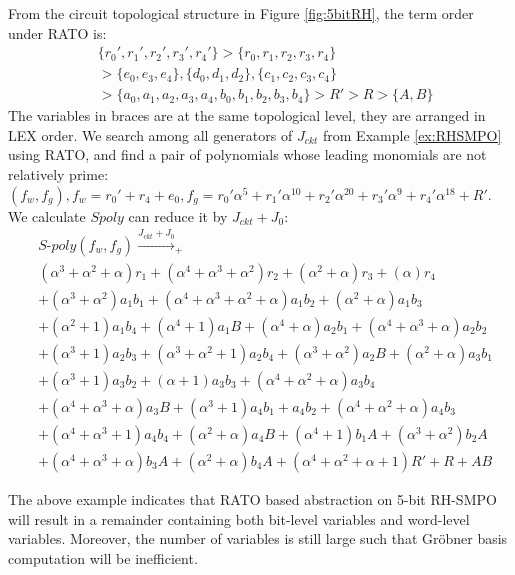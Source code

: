 \begin{Example}
\label{ex:newRATO}
From the circuit topological structure in Figure \ref{fig:5bitRH}, the term order under RATO is:
\begin{align}
&\{r_0',r_1',r_2',r_3',r_4'\}>\{r_0,r_1,r_2,r_3,r_4\}\nonumber\\
&>\{e_0,e_3,e_4\},\{d_0,d_1,d_2\},\{c_1,c_2,c_3,c_4\}\nonumber\\
&>\{a_0,a_1,a_2,a_3,a_4,b_0,b_1,b_2,b_3,b_4\}>R'>R>\{A,B\}\nonumber
\end{align}
The variables in braces are at the same topological level, they are arranged in LEX order. 
We search among all generators of $J_{ckt}$ from Example \ref{ex:RHSMPO} using RATO, 
and find a pair of polynomials whose leading 
monomials are not relatively prime:
$(f_w,f_g), f_w = r_0'+r_4+e_0, f_g =r_0'\alpha^5+r_1'\alpha^{10}+r_2'\alpha^{20}+r_3'\alpha^9+r_4'\alpha^{18} + R'$.
We calculate $Spoly$ can reduce it by $J_{ckt}+J_0$:
\begin{align}
&S\text{-}poly(f_w,f_g) \xrightarrow{J_{ckt}+J_0}_{+}\nonumber\\
&(\alpha^3+\alpha^2+\alpha) r_1+(\alpha^4+\alpha^3+\alpha^2) r_2+(\alpha^2+\alpha) r_3+(\alpha) r_4\nonumber\\
&+(\alpha^3+\alpha^2) a_1 b_1+(\alpha^4+\alpha^3+\alpha^2+\alpha) a_1 b_2+(\alpha^2+\alpha) a_1 b_3\nonumber\\
&+(\alpha^2+1) a_1 b_4+(\alpha^4+1) a_1 B+(\alpha^4+\alpha) a_2 b_1+(\alpha^4+\alpha^3+\alpha) a_2 b_2\nonumber\\
&+(\alpha^3+1) a_2 b_3+(\alpha^3+\alpha^2+1) a_2 b_4+(\alpha^3+\alpha^2) a_2 B+(\alpha^2+\alpha) a_3 b_1\nonumber\\
&+(\alpha^3+1) a_3 b_2+(\alpha+1) a_3 b_3+(\alpha^4+\alpha^2+\alpha) a_3 b_4\nonumber\\
&+(\alpha^4+\alpha^3+\alpha) a_3 B+(\alpha^3+1) a_4 b_1+a_4 b_2+(\alpha^4+\alpha^2+\alpha) a_4 b_3\nonumber\\
&+(\alpha^4+\alpha^3+1) a_4 b_4+(\alpha^2+\alpha) a_4 B+(\alpha^4+1) b_1 A+(\alpha^3+\alpha^2) b_2 A\nonumber\\
&+(\alpha^4+\alpha^3+\alpha) b_3 A+(\alpha^2+\alpha) b_4 A+(\alpha^4+\alpha^2+\alpha+1) R'+R+A B\nonumber
\end{align}
\end{Example}
The above example indicates that RATO based abstraction on 5-bit RH-SMPO will result in a remainder containing both
bit-level variables and word-level variables. Moreover, the number of variables is still large such that
Gr\"obner basis computation will be inefficient.

